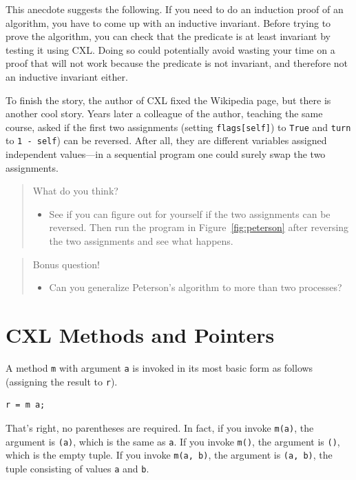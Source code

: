 \documentclass{report}
\newenvironment{code}{
\tcolorbox
}{
\endtcolorbox
}
\begin{document}
This anecdote suggests the following.  If you need to do an induction
proof of an algorithm, you have to come up with an inductive invariant.
Before trying to prove the algorithm, you can check that the predicate is
at least invariant by testing it using CXL.  Doing so could potentially
avoid wasting your time on a proof that will not work because the
predicate is not invariant, and therefore not an inductive invariant either.

To finish the story, the author of CXL fixed the Wikipedia page, but there
is another cool story.  Years later a colleague of the author, teaching
the same course, asked if the first two assignments (setting \texttt{flags[self]})
to \texttt{True} and \texttt{turn} to \texttt{1 - self}) can be reversed.
After all, they are different variables assigned independent values---in a
sequential program one could surely swap the two assignments.

\begin{quote}
What do you think?
\begin{itemize}
\item See if you can figure out for yourself if the two assignments can be
reversed.  Then run the program in Figure~\ref{fig:peterson} after reversing
the two assignments and see what happens.
\end{itemize}
\end{quote}

\begin{quote}
Bonus question!
\begin{itemize}
\item Can you generalize Peterson's algorithm to more than two processes?
\end{itemize}
\end{quote}

\chapter{CXL Methods and Pointers}

A method \texttt{m} with argument \texttt{a} is invoked in its
most basic form as follows (assigning the result to \texttt{r}).
\begin{code}
\begin{verbatim}
r = m a;
\end{verbatim}
\end{code}
That's right, no parentheses are required.  In fact, if you invoke
\texttt{m(a)}, the argument is \texttt{(a)}, which is the same
as \texttt{a}.
If you invoke \texttt{m()}, the argument is \texttt{()},
which is the empty tuple.
If you invoke \texttt{m(a, b)}, the argument is \texttt{(a, b)},
the tuple consisting of values \texttt{a} and \texttt{b}.
\end{document}
